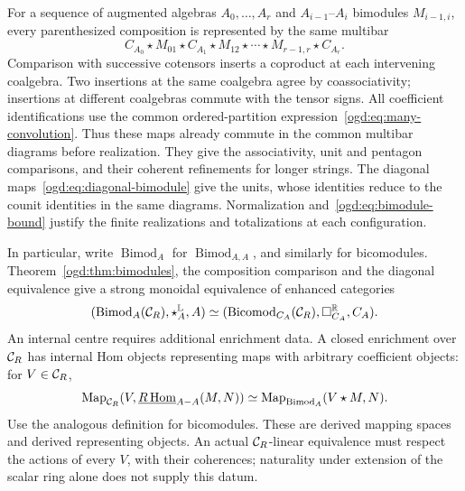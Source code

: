 For a sequence of augmented algebras \(A_0,\ldots,A_r\) and \(A_{i-1}\)--\(A_i\) bimodules \(M_{i-1,i}\), every parenthesized composition is represented by the same multibar
\begin{equation}\label{ogd:eq:successive-multibar}
 C_{A_0}\star M_{01}\star C_{A_1}\star M_{12}\star\cdots
 \star M_{r-1,r}\star C_{A_r}.
\end{equation}
Comparison with successive cotensors inserts a coproduct at each intervening coalgebra.
Two insertions at the same coalgebra agree by coassociativity; insertions at different coalgebras commute with the tensor signs.
All coefficient identifications use the common ordered-partition expression~\eqref{ogd:eq:many-convolution}.
Thus these maps already commute in the common multibar diagrams before realization.
They give the associativity, unit and pentagon comparisons, and their coherent refinements for longer strings.
The diagonal maps~\eqref{ogd:eq:diagonal-bimodule} give the units, whose identities reduce to the counit identities in the same diagrams.
Normalization and~\eqref{ogd:eq:bimodule-bound} justify the finite realizations and totalizations at each configuration.

In\label{ogd:def:diagonal-bimodule-notation} particular, write \(\operatorname{Bimod}_A\) for \(\operatorname{Bimod}_{A,A}\), and similarly for bicomodules.
Theorem~\ref{ogd:thm:bimodules}, the composition comparison and the diagonal equivalence give a strong monoidal equivalence of enhanced categories
\begin{equation}\label{ogd:eq:native-monoidal}
 (\operatorname{Bimod}_A(\mathcal C_R),\star_A^{\mathbb L},A)
 \simeq
 (\operatorname{Bicomod}_{C_A}(\mathcal C_R),\mathbin{\Box}_{C_A}^{\mathbb R},C_A).
\end{equation}
An internal centre requires additional enrichment data.
A closed enrichment over \(\mathcal C_R\) has internal Hom objects representing maps with arbitrary coefficient objects: for \(V\in\mathcal C_R\),
\[
 \operatorname{Map}_{\mathcal C_R}
  (V,\underline{R\operatorname{Hom}}_{A-A}(M,N))
 \simeq
 \operatorname{Map}_{\operatorname{Bimod}_A}(V\star M,N).
\]
Use the analogous definition for bicomodules.
These are derived mapping spaces and derived representing objects.
An actual \(\mathcal C_R\)-linear equivalence must respect the actions of every \(V\), with their coherences; naturality under extension of the scalar ring alone does not supply this datum.


